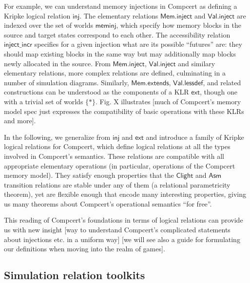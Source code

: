 \documentclass[acmsmall,anonymous,review]{acmart}
\newcommand{\kw}[1]{\ensuremath{ \textsf{#1} }}
\begin{document}
For example,
we can understand memory injections in Compcert
as defining a Kripke logical relation \kw{inj}.
The elementary relations \kw{Mem.inject} and \kw{Val.inject}
are indexed over the set of worlds \kw{meminj},
which specify how memory blocks in the source and target states
correspond to each other.
The accessibility relation \kw{inject\_incr}
specifies for a given injection
what are its possible ``futures'' are:
they should map existing blocks in the same way
but may additionally map blocks newly allocated in the source.
From \kw{Mem.inject}, \kw{Val.inject} and similary elementary relations,
more complex relations are defined,
culminating in a number of simulation diagrams.
Similarly,
\kw{Mem.extends}, \kw{Val.lessdef}, and related constructions
can be understood as the components of a KLR \kw{ext},
though one with a trivial set of worlds $\{*\}$.
Fig. X illustrates [much of Compcert's memory model spec
just expresses the compatibility of basic operations
with these KLRs and more].

In the following,
we generalize from \kw{inj} and \kw{ext} and
introduce a family of Kripke logical relations for Compcert,
which define logical relations at all the types
involved in Compcert's semantics.
These relations are compatible with
all appropriate elementary operations
(in particular, operations of the Compcert memory model).
They satisfy enough properties that
the \kw{Clight} and \kw{Asm} transition relations
are stable under any of them
(a relational parametricity theorem),
yet are flexible enough that encode many interesting properties,
giving us many theorems about Compcert's operational semantics
``for free''.

This reading of Compcert's foundations
in terms of logical relations
can provide us with new insight
[way to understand Compcert's complicated
statements about injections etc. in a uniform way]
[we will see also a guide for formulating our definitions
when moving into the realm of games].


\subsection{Simulation relation toolkits} %
\end{document}

